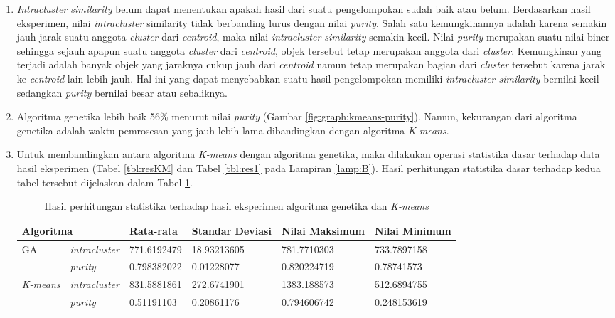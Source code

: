 \begin{enumerate}
	\item \textit{Intracluster similarity} belum dapat menentukan apakah hasil dari suatu pengelompokan sudah baik atau belum. Berdasarkan hasil eksperimen, nilai \textit{intracluster} similarity tidak berbanding lurus dengan nilai \textit{purity}. Salah satu kemungkinannya adalah karena semakin jauh jarak suatu anggota \textit{cluster} dari \textit{centroid}, maka nilai \textit{intracluster similarity} semakin kecil. Nilai \textit{purity} merupakan suatu nilai biner sehingga sejauh apapun suatu anggota \textit{cluster} dari \textit{centroid}, objek tersebut tetap merupakan anggota dari \textit{cluster}. Kemungkinan yang terjadi adalah banyak objek yang jaraknya cukup jauh dari \textit{centroid} namun tetap merupakan bagian dari \textit{cluster} tersebut karena jarak ke \textit{centroid} lain lebih jauh. Hal ini yang dapat menyebabkan suatu hasil pengelompokan memiliki \textit{intracluster similarity} bernilai kecil sedangkan \textit{purity} bernilai besar atau sebaliknya.
	\item Algoritma genetika lebih baik 56\% menurut nilai \textit{purity} (Gambar \ref{fig:graph:kmeans-purity}). Namun, kekurangan dari algoritma genetika adalah waktu pemrosesan yang jauh lebih lama dibandingkan dengan algoritma \textit{K-means}. 
	
	\item Untuk membandingkan antara algoritma \textit{K-means} dengan algoritma genetika, maka dilakukan operasi statistika dasar terhadap data hasil eksperimen (Tabel \ref{tbl:resKM} dan Tabel \ref{tbl:res1} pada Lampiran \ref{lamp:B}). Hasil perhitungan statistika dasar terhadap kedua tabel tersebut dijelaskan dalam Tabel \ref{tbl:stat-res}.
	
\begin{table}[H]
\caption{Hasil perhitungan statistika terhadap hasil eksperimen algoritma genetika dan \textit{K-means}}
\begin{tabular}{|l|l|l|l|l|l|}
\hline
\multicolumn{2}{|l|}{Algoritma}         & Rata-rata   & Standar Deviasi & Nilai Maksimum & Nilai Minimum \\ \hline
\multirow{2}{*}{GA}      & \textit{intracluster} & 771.6192479 & 18.93213605     & 781.7710303    & 733.7897158   \\ \cline{2-6} 
                         & \textit{purity}       & 0.798382022 & 0.01228077      & 0.820224719    & 0.78741573    \\ \hline
\multirow{2}{*}{\textit{K-means}} & \textit{intracluster} & 831.5881861 & 272.6741901     & 1383.188573    & 512.6894755   \\ \cline{2-6} 
                         & \textit{purity}       & 0.51191103  & 0.20861176      & 0.794606742    & 0.248153619   \\ \hline
\end{tabular}
\label{tbl:stat-res}
\end{table}
	

\end{enumerate}

